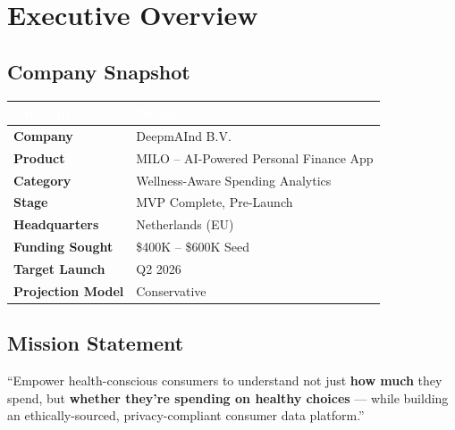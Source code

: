 \documentclass[11pt,a4paper]{article}
\begin{document}
\vspace{1cm}

\newpage

\tableofcontents
\newpage

\section{Executive Overview}

\subsection{Company Snapshot}

\begin{center}
\begin{tabular}{>{}L{4cm} L{9cm}}
    \toprule
    \textcolor{white}{\textbf{Attribute}} & \textcolor{white}{\textbf{Details}}\\
    \midrule
    \textbf{Company} & DeepmAInd B.V.\\
    \textbf{Product} & MILO -- AI-Powered Personal Finance App\\
    \textbf{Category} & Wellness-Aware Spending Analytics\\
    \textbf{Stage} & MVP Complete, Pre-Launch\\
    \textbf{Headquarters} & Netherlands (EU)\\
    \textbf{Funding Sought} & \$400K -- \$600K Seed\\
    \textbf{Target Launch} & Q2 2026\\
    \textbf{Projection Model} & Conservative\\
    \bottomrule
\end{tabular}
\end{center}

\subsection{Mission Statement}

\begin{quotebox}
``Empower health-conscious consumers to understand not just \textbf{how much} they spend, but \textbf{whether they're spending on healthy choices} --- while building an ethically-sourced, privacy-compliant consumer data platform.''
\end{quotebox}
\end{document}

